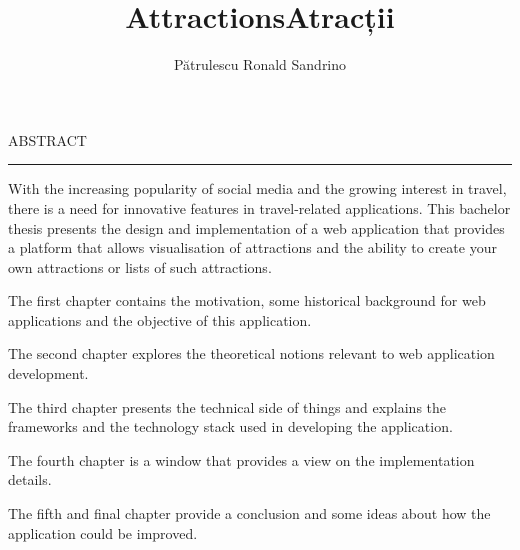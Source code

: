 \documentclass[12pt]{report}
\begin{document}
\title{Attractions}					   
\author{Pătrulescu Ronald Sandrino}											
				
\maketitle

\title{Atracții}

\maketitle

{} 

\cleardoublepage
ABSTRACT
\vspace{0.5cm}	
\hrule
\vspace{0.5cm}	

\par With the increasing popularity of social media and the growing interest in travel, there is a need for innovative features in travel-related applications. This bachelor thesis presents the design and implementation of a web application that provides a platform that allows visualisation of attractions and the ability to create your own attractions or lists of such attractions.

\par The first chapter contains the motivation, some historical background for web applications and the objective of this application.

\par The second chapter explores the theoretical notions relevant to web application development.

\par The third chapter presents the technical side of things and explains the frameworks and the technology stack used in developing the application.

\par The fourth chapter is a window that provides a view on the implementation details.

\par The fifth and final chapter provide a conclusion and some ideas about how the application could be improved.



\tableofcontents


\newpage
{}










\end{document}
